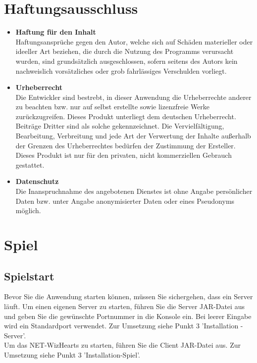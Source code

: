 \documentclass[titlepage,10pt,a4paper]{article}
\begin{document}
\section{Haftungsausschluss}
\begin{itemize}
\item \textbf{Haftung für den Inhalt} \\
Haftungsansprüche gegen den Autor, welche sich auf Schäden materieller oder ideeller Art beziehen, die durch die Nutzung des Programms verursacht wurden, sind grundsätzlich ausgeschlossen, sofern seitens des Autors kein nachweislich vorsätzliches oder grob fahrlässiges Verschulden vorliegt. 

\item \textbf{Urheberrecht} \\
Die Entwickler sind bestrebt, in dieser Anwendung die Urheberrechte anderer zu beachten bzw. nur auf selbst erstellte sowie lizenzfreie Werke zurückzugreifen.
Dieses Produkt unterliegt dem deutschen Urheberrecht. Beiträge Dritter sind als solche gekennzeichnet. Die Vervielfältigung, Bearbeitung, Verbreitung und jede Art der Verwertung der Inhalte außerhalb der Grenzen des Urheberrechtes bedürfen der Zustimmung der Ersteller. Dieses Produkt ist  nur für den privaten, nicht kommerziellen Gebrauch gestattet.

\item \textbf{Datenschutz} \\
Die Inanspruchnahme des angebotenen Dienstes ist ohne Angabe persönlicher Daten bzw. unter Angabe anonymisierter Daten oder eines Pseudonyms möglich.
\end{itemize}

\section{Spiel}
\subsection{Spielstart}
Bevor Sie die Anwendung starten können, müssen Sie sichergehen, dass ein \gls{Server} läuft. Um einen eigenen \gls{Server} zu starten, führen Sie die \gls{Server} JAR-Datei aus und geben Sie die gewünschte Portnummer in die Konsole ein. Bei leerer Eingabe wird ein Standardport verwendet. Zur Umsetzung siehe Punkt 3 'Installation - Server'. \\
Um das NET-WizHearts zu starten, führen Sie die Client JAR-Datei aus.  Zur Umsetzung siehe Punkt 3 'Installation-Spiel'.\\
\end{document}
